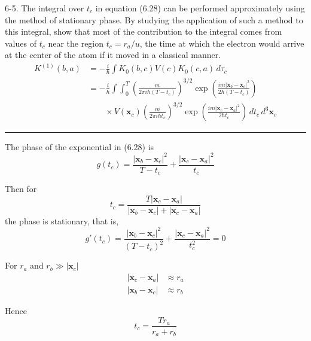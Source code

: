 \documentclass[12pt]{article}
\begin{document}
6-5.
The integral over $t_c$ in equation (6.28) can be performed
approximately using the method of stationary phase.
By studying the application of such a method to this integral,
show that most of the contribution to the integral comes from
values of $t_c$ near the region $t_c=r_a/u$, the time at which
the electron would arrive at the center of the atom if it
moved in a classical manner.
\begin{align*}
K^{(1)}(b,a)&=-\frac{i}{\hbar}\int K_0(b,c)V(c)K_0(c,a)\,d\tau_c
\\
&=-\frac{i}{\hbar}\int\int_0^T
\left(\frac{m}{2\pi i\hbar(T-t_c)}\right)^{3/2}
\exp\left(\frac{im|\mathbf x_b-\mathbf x_c|^2}{2\hbar(T-t_c)}\right)
\\
&\qquad{}\times
V(\mathbf x_c)
\left(\frac{m}{2\pi i\hbar t_c}\right)^{3/2}
\exp\left(\frac{im|\mathbf x_c-\mathbf x_a|^2}{2\hbar t_c}\right)
\,dt_c\,d^3\mathbf x_c
\tag{6.28}
\end{align*}

\bigskip
\hrule

\bigskip
The phase of the exponential in (6.28) is
\begin{equation*}
g(t_c)=
\frac{|\mathbf x_b-\mathbf x_c|^2}{T-t_c}
+
\frac{|\mathbf x_c-\mathbf x_a|^2}{t_c}
\end{equation*}

Then for
\begin{equation*}
t_c=\frac{T|\mathbf x_c-\mathbf x_a|}{|\mathbf x_b-\mathbf x_c|+|\mathbf x_c-\mathbf x_a|}
\end{equation*}
the phase is stationary, that is,
\begin{equation*}
g'(t_c)=
\frac{|\mathbf x_b-\mathbf x_c|^2}{(T-t_c)^2}
+
\frac{|\mathbf x_c-\mathbf x_a|^2}{t_c^2}
=0
\end{equation*}

For $r_a$ and $r_b\gg|\mathbf x_c|$
\begin{align*}
|\mathbf x_c-\mathbf x_a|&\approx r_a %
\\
|\mathbf x_b-\mathbf x_c|&\approx r_b %
\end{align*}

Hence
\begin{equation*}
t_c=\frac{Tr_a}{r_a+r_b}
\end{equation*}
\end{document}
